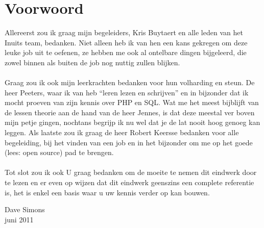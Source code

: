 \chapter*{Voorwoord}

Allereerst zou ik graag mijn begeleiders, Kris Buytaert en alle leden van het Inuits team, bedanken. Niet alleen heb ik van hen een kans gekregen om deze leuke job uit te oefenen, ze hebben me ook al ontelbare dingen bijgeleerd, die zowel binnen als buiten de job nog nuttig zullen blijken.\\\\
Graag zou ik ook mijn leerkrachten bedanken voor hun volharding en steun. De heer Peeters, waar ik van heb ``leren lezen en schrijven'' en in bijzonder dat ik mocht proeven van zijn kennis over PHP en SQL. Wat me het meest bijblijft van de lessen theorie aan de hand van de heer Jennes, is dat deze meestal ver boven mijn petje gingen, nochtans begrijp ik nu wel dat je de lat nooit hoog genoeg kan leggen. Als laatste zou ik graag de heer Robert Keersse bedanken voor alle begeleiding, bij het vinden van een job en in het bijzonder om me op het goede (lees: open source) pad te brengen.\\\\
Tot slot zou ik ook U graag bedanken om de moeite te nemen dit eindwerk door te lezen en er even op wijzen dat dit eindwerk geenszins een complete referentie is, het is enkel een basis waar u uw kennis verder op kan bouwen.\\

\begin{flushright}Dave Simons\\juni 2011\end{flushright}
